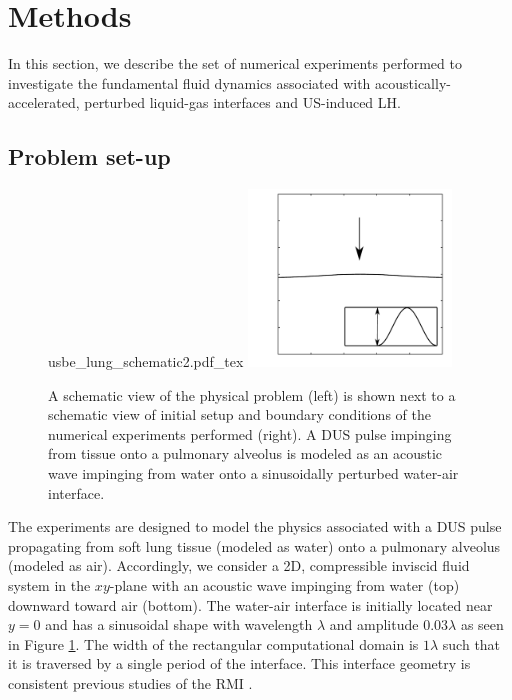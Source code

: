 \section{Methods} \label{sec:usbe_lung_methods}%
In this section, we describe the set of numerical experiments
performed to investigate the fundamental fluid dynamics associated
with acoustically-accelerated, perturbed liquid-gas interfaces and
\ac{US}-induced \ac{LH}.

\subsection{Problem set-up}
\label{subsec:setup}
\begin{figure}[t]
  \centering

  \def\svgwidth{0.48\textwidth}
  {usbe_lung_schematic2.pdf_tex} \hfill%
  \includegraphics[width=0.48\textwidth]{./figs/lung_figs/usbe_model_schematic} \hfill
  \caption[A schematic view of lung \ac{DUS} and the model problem]{A schematic view of the physical problem (left) is shown next
    to a schematic view of initial setup and boundary conditions of the
    numerical experiments performed (right). A \ac{DUS} pulse impinging
    from tissue onto a pulmonary alveolus is modeled as an acoustic wave
    impinging from water onto a sinusoidally perturbed water-air interface.}
  \label{fig:lung_schematic}
\end{figure}
The experiments are designed to model the physics associated with a
\ac{DUS} pulse propagating from soft lung tissue (modeled as water)
onto a pulmonary alveolus (modeled as air). Accordingly, we consider a
2D, compressible inviscid fluid system in the $xy$-plane with an
acoustic wave impinging from water (top) downward toward air
(bottom). The water-air interface is initially located near $y=0$ 
and has a sinusoidal shape with wavelength $\lambda$ and amplitude
$0.03\lambda$ as seen in Figure \ref{fig:lung_schematic}. The width
of the rectangular computational domain is $1\lambda$ such that it is
traversed by a single period of the interface. This interface geometry
is consistent previous studies of the \ac{RMI}
\citep{Brouillette2002}.









